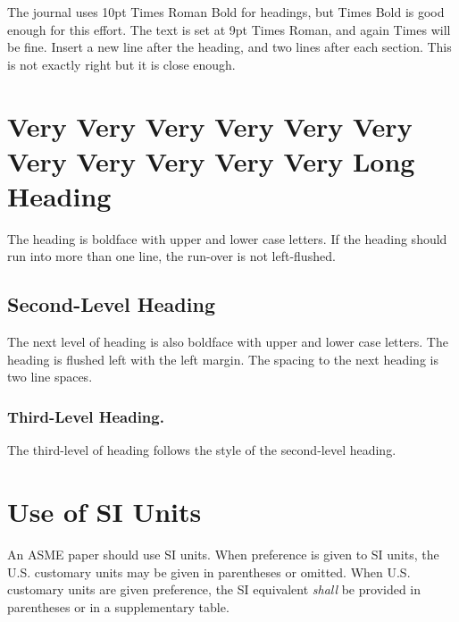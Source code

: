 \documentclass[12pt]{asme2ej}
\begin{document}
    The journal uses 10pt Times Roman Bold for headings, but Times Bold is good enough for this effort. The text is set at 9pt Times Roman, and again Times will be fine. Insert a new line after the heading, and two lines after each section. This is not exactly right but it is close enough.




    \section{Very Very Very Very Very Very Very Very Very Very Very Long Heading}

    The heading is boldface with upper and lower case letters.
    If the heading should run into more than one line, the run-over is not left-flushed.


    \subsection{Second-Level Heading}

    The next level of heading is also boldface with upper and lower case letters.
    The heading is flushed left with the left margin. The spacing to the next heading is two line spaces.


    \subsubsection{Third-Level Heading.}

    The third-level of heading follows the style of the second-level heading.




    \section{Use of SI Units}

    An ASME paper should use SI units. When preference is given to SI units, the U.S. customary units may be given in parentheses or omitted. When U.S. customary units are given preference, the SI equivalent {\em shall} be provided in parentheses or in a supplementary table.
\end{document}
